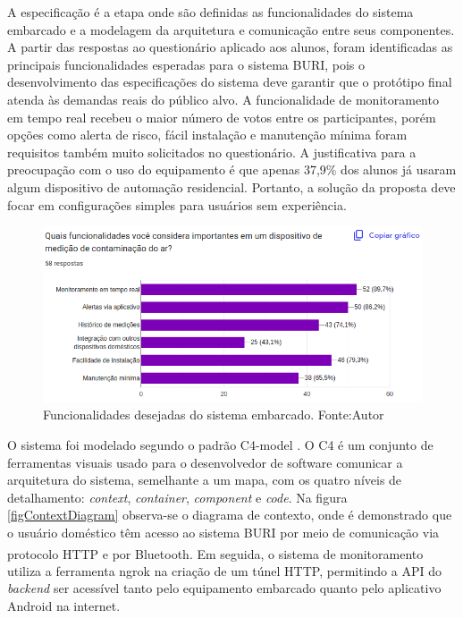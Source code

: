 A especificação é a etapa onde são definidas as funcionalidades do sistema embarcado e a modelagem da arquitetura e comunicação entre 
seus componentes. A partir das respostas ao questionário aplicado aos alunos, foram identificadas as principais funcionalidades esperadas 
para o sistema BURI, pois o desenvolvimento das especificações do sistema deve garantir que o protótipo final atenda às demandas reais do
público alvo. A funcionalidade de monitoramento em tempo real recebeu o maior número de votos entre os participantes, porém opções como alerta de risco, fácil instalação e 
manutenção mínima foram requisitos também muito solicitados no questionário. A justificativa para a preocupação com o uso do equipamento é que apenas 37,9\% dos alunos já usaram 
algum dispositivo de automação residencial. Portanto, a solução da proposta deve focar em configurações simples para usuários sem experiência.
\begin{figure}[ht]
    \centering
    \includegraphics[width=.77\textwidth]{img/graf1-funcionalidades.png}
    \caption{Funcionalidades desejadas do sistema embarcado. Fonte:Autor}\label{figFuncionalidades}
\end{figure}

O sistema foi modelado segundo o padrão C4-model \cite{c4-model}. O C4 é um conjunto de ferramentas visuais usado para 
o desenvolvedor de software comunicar a arquitetura do sistema, semelhante a um mapa, com os quatro níveis de detalhamento: \textit{context}, 
\textit{container}, \textit{component} e \textit{code}. Na figura \ref{figContextDiagram} observa-se o diagrama de contexto, onde é demonstrado 
que o usuário doméstico têm acesso ao sistema BURI por meio de comunicação via protocolo HTTP e por Bluetooth\textsuperscript{\textregistered}. Em seguida, o 
sistema de monitoramento utiliza a ferramenta ngrok \cite{ngrok} na criação de um túnel HTTP, permitindo a API do \textit{backend} ser acessível tanto pelo equipamento 
embarcado quanto pelo aplicativo Android na internet. 


